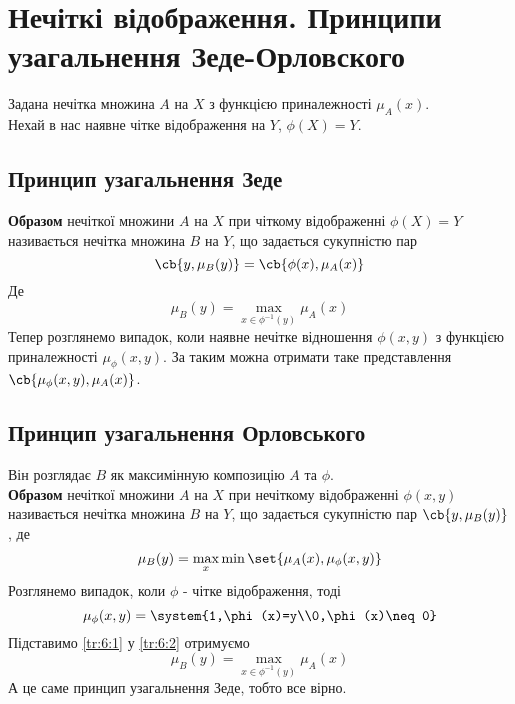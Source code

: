 \section{Нечіткі відображення. Принципи узагальнення Зеде-Орловского} 
Задана нечітка множина $A$ на $X$ з функцією приналежності $\mu_A(x)$.\\
Нехай в нас наявне чітке відображення на $Y$, $\phi(X) = Y$.\\
\subsection{Принцип узагальнення Зеде}
\textbf{Образом} нечіткої множини $A$ на $X$ при чіткому відображенні $\phi(X) = Y$ називається нечітка множина $B$ на $Y$, що задається сукупністю пар
\begin{equation}
\cb{y,\mu_B(y)} = \cb{\phi(x),\mu_A(x)}
\end{equation}
Де
\begin{equation}
\mu_B(y)=\max\limits_{x\in\phi^{-1}(y)} \mu_A(x)
\end{equation}
Тепер розглянемо випадок, коли наявне нечітке відношення $\phi(x,y)$ з функцією приналежності $\mu_\phi(x,y)$.
За таким можна отримати таке представлення $\cb{\mu_\phi(x,y),\mu_A(x)}$. 
\subsection{Принцип узагальнення Орловського}
Він розглядає $B$ як максимінную композицію $A$ та $\phi$.\\
\textbf{Образом} нечіткої множини $A$ на $X$ при нечіткому відображенні $\phi(x,y)$ називається нечітка множина $B$ на $Y$, що задається сукупністю пар $\cb{y,\mu_B(y)}$, де
\begin{equation}\label{tr:6:1}
\mu_B(y) = \max\limits_x \min\set{\mu_A(x),\mu_\phi(x,y)}
\end{equation}
Розглянемо випадок, коли $\phi$ - чітке відображення, тоді
\begin{equation}\label{tr:6:2}
\mu_\phi(x,y) = \system{1,\phi(x)=y\\0,\phi(x)\neq0}
\end{equation}
Підставимо \eqref{tr:6:1} у \eqref{tr:6:2} отримуємо 
\begin{equation}
\mu_B(y)=\max\limits_{x\in\phi^{-1}(y)} \mu_A(x)
\end{equation}
А це саме принцип узагальнення Зеде, тобто все вірно.\\
